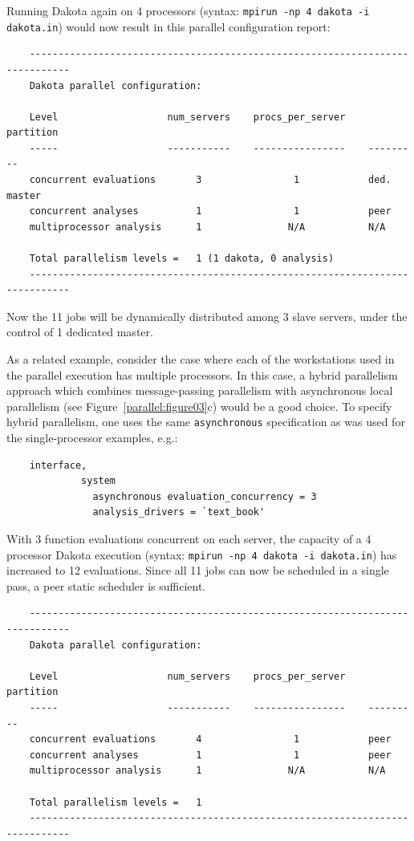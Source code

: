 Running Dakota again on 4 processors (syntax: \texttt{mpirun -np 4
  dakota -i dakota.in}) would now result in this parallel
configuration report:
\begin{small}
\begin{verbatim}
    -----------------------------------------------------------------------------
    Dakota parallel configuration:

    Level                   num_servers    procs_per_server    partition
    -----                   -----------    ----------------    ---------
    concurrent evaluations       3                1            ded. master
    concurrent analyses          1                1            peer
    multiprocessor analysis      1               N/A           N/A

    Total parallelism levels =   1 (1 dakota, 0 analysis)
    -----------------------------------------------------------------------------
\end{verbatim}
\end{small}

Now the 11 jobs will be dynamically distributed among 3 slave servers,
under the control of 1 dedicated master.

As a related example, consider the case where each of the workstations
used in the parallel execution has multiple processors. In this case,
a hybrid parallelism approach which combines message-passing
parallelism with asynchronous local parallelism (see
Figure~\ref{parallel:figure03}c) would be a good choice. To specify
hybrid parallelism, one uses the same \texttt{asynchronous}
specification as was used for the single-processor examples, e.g.:
\begin{small}
\begin{verbatim}
    interface,
             system
               asynchronous evaluation_concurrency = 3
               analysis_drivers = `text_book'
\end{verbatim}
\end{small}

With 3 function evaluations concurrent on each server, the capacity of
a 4 processor Dakota execution (syntax: \texttt{mpirun -np 4 dakota -i
  dakota.in}) has increased to 12 evaluations. Since all 11 jobs can
now be scheduled in a single pass, a peer static scheduler is sufficient.

\begin{small}
\begin{verbatim}
    -----------------------------------------------------------------------------
    Dakota parallel configuration:

    Level                   num_servers    procs_per_server    partition
    -----                   -----------    ----------------    ---------
    concurrent evaluations       4                1            peer
    concurrent analyses          1                1            peer
    multiprocessor analysis      1               N/A           N/A

    Total parallelism levels =   1
    -----------------------------------------------------------------------------
\end{verbatim}
\end{small}

